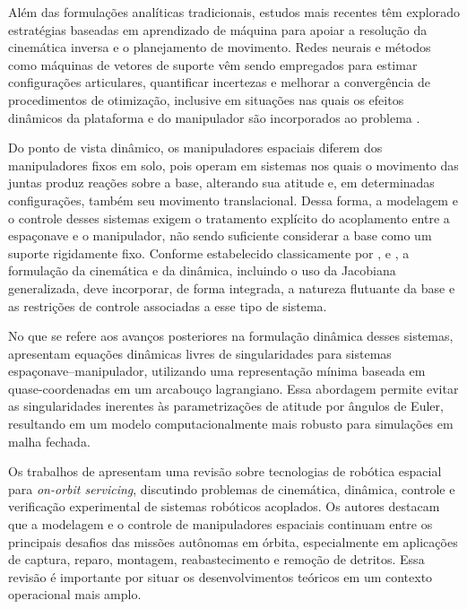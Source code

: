 Além das formulações analíticas tradicionais, estudos mais recentes têm explorado estratégias baseadas em aprendizado de máquina para apoiar a resolução da cinemática inversa e o planejamento de movimento. Redes neurais e métodos como máquinas de vetores de suporte vêm sendo empregados para estimar configurações articulares, quantificar incertezas e melhorar a convergência de procedimentos de otimização, inclusive em situações nas quais os efeitos dinâmicos da plataforma e do manipulador são incorporados ao problema \cite{santos2022uncertainty,santos2023physics,santos2022machine}.

Do ponto de vista dinâmico, os manipuladores espaciais diferem dos manipuladores fixos em solo, pois operam em sistemas nos quais o movimento das juntas produz reações sobre a base, alterando sua atitude e, em determinadas configurações, também seu movimento translacional. Dessa forma, a modelagem e o controle desses sistemas exigem o tratamento explícito do acoplamento entre a espaçonave e o manipulador, não sendo suficiente considerar a base como um suporte rigidamente fixo. Conforme estabelecido classicamente por \cite{umetani1989resolved}, \cite{papadopoulos1991nature} e \cite{dubowsky1993kinematics}, a formulação da cinemática e da dinâmica, incluindo o uso da Jacobiana generalizada, deve incorporar, de forma integrada, a natureza flutuante da base e as restrições de controle associadas a esse tipo de sistema.

No que se refere aos avanços posteriores na formulação dinâmica desses sistemas, \cite{from2011singularityfree} apresentam equações dinâmicas livres de singularidades para sistemas espaçonave--manipulador, utilizando uma representação mínima baseada em quase-coordenadas em um arcabouço lagrangiano. Essa abordagem permite evitar as singularidades inerentes às parametrizações de atitude por ângulos de Euler, resultando em um modelo computacionalmente mais robusto para simulações em malha fechada.

Os trabalhos de \cite{floresabad2014review} apresentam uma revisão sobre tecnologias de robótica espacial para \textit{on-orbit servicing}, discutindo problemas de cinemática, dinâmica, controle e verificação experimental de sistemas robóticos acoplados. Os autores destacam que a modelagem e o controle de manipuladores espaciais continuam entre os principais desafios das missões autônomas em órbita, especialmente em aplicações de captura, reparo, montagem, reabastecimento e remoção de detritos. Essa revisão é importante por situar os desenvolvimentos teóricos em um contexto operacional mais amplo.

